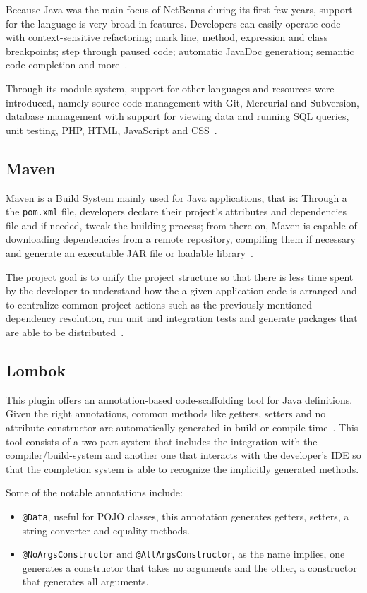Because Java was the main focus of NetBeans during its first few years, support for the language is very broad in features. Developers can easily operate code with context-sensitive refactoring; mark line, method, expression and class breakpoints; step through paused code; automatic JavaDoc generation; semantic code completion and more~\cite{nbassistance}.

Through its module system, support for other languages and resources were introduced, namely source code management with Git, Mercurial and Subversion, database management with support for viewing data and running \gls{SQL} queries, unit testing, PHP, HTML, JavaScript and CSS~\cite{nettutorials}.

\subsection{Maven}
Maven is a Build System mainly used for Java applications, that is: Through a the \texttt{pom.xml} file, developers declare their project's attributes and dependencies file and if needed, tweak the building process; from there on, Maven is capable of downloading dependencies from a remote repository, compiling them if necessary and generate an executable \gls{JAR} file or loadable library~\cite{maven}.

The project goal is to unify the project structure so that there is less time spent by the developer to understand how the a given application code is arranged and to centralize common project actions such as the previously mentioned dependency resolution, run unit and integration tests and generate packages that are able to be distributed~\cite{mavenintro}.

\subsection{Lombok}\label{tech:lombok}
This plugin offers an annotation-based code-scaffolding tool for Java definitions. Given the right annotations, common methods like getters, setters and no attribute constructor are automatically generated in build or compile-time~\cite{lombok}. This tool consists of a two-part system that includes the integration with the compiler/build-system and another one that interacts with the developer's \gls{IDE} so that the completion system is able to recognize the implicitly generated methods.

Some of the notable annotations include:
\begin{itemize}
\item \texttt{@Data}, useful for \gls{POJO} classes, this annotation generates getters, setters, a string converter and equality methods.
\item \texttt{@NoArgsConstructor} and \texttt{@AllArgsConstructor}, as the name implies, one generates a constructor that takes no arguments and the other, a constructor that generates all arguments.
\end{itemize}

